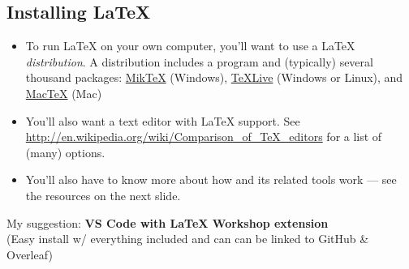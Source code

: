 \documentclass[aspectratio=169]{beamer}
\begin{document}
\subsection{Installing \LaTeX{}}
\begin{frame}{\insertsubsection}
\begin{itemize}
\item To run \LaTeX{} on your own computer, you'll want to use a \LaTeX{} \emph{distribution}. A distribution includes a  program and (typically) several thousand packages:
\href{http://miktex.org/}{Mik\TeX} (Windows), \href{http://tug.org/texlive/}{\TeX Live} (Windows or Linux), and \href{http://tug.org/mactex/}{Mac\TeX} (Mac)
\item You'll also want a text editor with \LaTeX{} support. See \url{http://en.wikipedia.org/wiki/Comparison_of_TeX_editors} for a list of (many) options.
\item You'll also have to know more about how  and its related tools
work --- see the resources on the next slide.
\end{itemize}
My suggestion: \textbf{VS Code with LaTeX Workshop extension} \\ 
(Easy install w/ everything included and can can be linked to GitHub \& Overleaf)
\end{frame}

\end{document}
